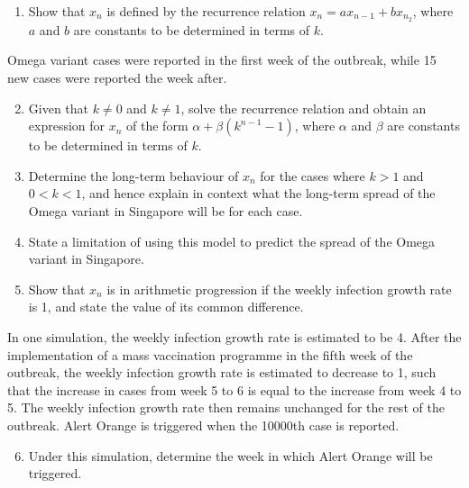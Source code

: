 \documentclass{jhwhw}
\begin{document}
        \begin{enumerate}
            \item Show that $x_n$ is defined by the recurrence relation $x_n = ax_{n-1} + bx_{n_2}$, where $a$ and $b$ are constants to be determined in terms of $k$.
        \end{enumerate}

         Omega variant cases were reported in the first week of the outbreak, while 15 new cases were reported the week after.

        \begin{enumerate}
            \setcounter{enumi}{1}
            \item Given that $k \neq 0$ and $k \neq 1$, solve the recurrence relation and obtain an expression for $x_n$ of the form $\alpha + \beta\left(k^{n-1} - 1\right)$, where $\alpha$ and $\beta$ are constants to be determined in terms of $k$.
            \item Determine the long-term behaviour of $x_n$ for the cases where $k > 1$ and $0 < k < 1$, and hence explain in context what the long-term spread of the Omega variant in Singapore will be for each case.
            \item State a limitation of using this model to predict the spread of the Omega variant in Singapore.
            \item Show that $x_n$ is in arithmetic progression if the weekly infection growth rate is 1, and state the value of its common difference.
        \end{enumerate}

        \noindent In one simulation, the weekly infection growth rate is estimated to be 4. After the implementation of a mass vaccination programme in the fifth week of the outbreak, the weekly infection growth rate is estimated to decrease to 1, such that the increase in cases from week 5 to 6 is equal to the increase from week 4 to 5. The weekly infection growth rate then remains unchanged for the rest of the outbreak. Alert Orange is triggered when the 10000th case is reported.

        \begin{enumerate}
            \setcounter{enumi}{5}
            \item Under this simulation, determine the week in which Alert Orange will be triggered.
        \end{enumerate}

    \solution
\end{document}
